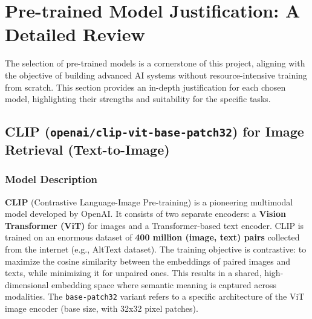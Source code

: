\documentclass{article}
\begin{document}
\section{Pre-trained Model Justification: A Detailed Review}
\label{sec:model_justification}


The selection of pre-trained models is a cornerstone of this project, aligning with the objective of building advanced AI systems without resource-intensive training from scratch. This section provides an in-depth justification for each chosen model, highlighting their strengths and suitability for the specific tasks.

\subsection{CLIP (\texttt{openai/clip-vit-base-patch32}) for Image Retrieval (Text-to-Image)}
\subsubsection{Model Description}
\textbf{CLIP} (Contrastive Language-Image Pre-training) is a pioneering multimodal model developed by OpenAI. It consists of two separate encoders: a \textbf{Vision Transformer (ViT)} for images and a Transformer-based text encoder. CLIP is trained on an enormous dataset of \textbf{400 million (image, text) pairs} collected from the internet (e.g., AltText dataset). The training objective is contrastive: to maximize the cosine similarity between the embeddings of paired images and texts, while minimizing it for unpaired ones. This results in a shared, high-dimensional embedding space where semantic meaning is captured across modalities. The \texttt{base-patch32} variant refers to a specific architecture of the ViT image encoder (base size, with 32x32 pixel patches).
\end{document}
